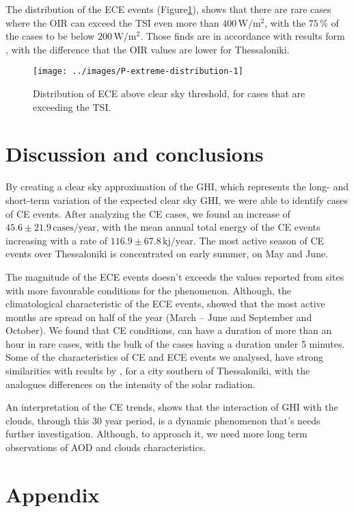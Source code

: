 \documentclass[preprint, 5p,
authoryear]{elsarticle} %
\begin{document}
The distribution of the ECE events
(Figure\nobreakspace{}\ref{fig:P-extreme-distribution}), shows that
there are rare cases where the OIR can exceed the TSI even more than
\(400\,\text{W}/\text{m}^2\), with the \(75\,\%\) of the cases to be
below \(200\,\text{W}/\text{m}^2\). Those finds are in accordance with
results form \citet{Vamvakas2020}, with the difference that the OIR
values are lower for Thessaloniki.

\begin{figure}

{\centering \texttt{[image: ../images/P-extreme-distribution-1]} 

}

\caption{Distribution of ECE above clear sky threshold, for cases that are exceeding the TSI.}\label{fig:P-extreme-distribution}
\end{figure}

\hypertarget{discussion-and-conclusions}{%
\section{Discussion and conclusions}\label{discussion-and-conclusions}}

By creating a clear sky approximation of the GHI, which represents the
long- and short-term variation of the expected clear sky GHI, we were
able to identify cases of CE events. After analyzing the CE cases, we
found an increase of \(45.6\pm 21.9\,\text{cases}/\text{year}\), with
the mean annual total energy of the CE events increasing with a rate of
\(116.9\pm 67.8\,\text{kj}/\text{year}\). The most active season of CE
events over Thessaloniki is concentrated on early summer, on May and
June.

The magnitude of the ECE events doesn't exceeds the values reported from
sites with more favourable conditions for the phenomenon. Although, the
climatological characteristic of the ECE events, showed that the most
active months are spread on half of the year (March -- June and
September and October). We found that CE conditions, can have a duration
of more than an hour in rare cases, with the bulk of the cases having a
duration under 5 minutes. Some of the characteristics of CE and ECE
events we analysed, have strong similarities with results by
\citet{Vamvakas2020}, for a city southern of Thessaloniki, with the
analogues differences on the intensity of the solar radiation.

An interpretation of the CE trends, shows that the interaction of GHI
with the clouds, through this 30 year period, is a dynamic phenomenon
that's needs further investigation. Although, to approach it, we need
more long term observations of AOD and clouds characteristics.

\hypertarget{appendix}{%
\section*{Appendix}\label{appendix}}


\end{document}
